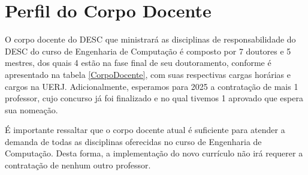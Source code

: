 \section{Perfil do Corpo Docente}
O corpo docente do DESC que ministrará as disciplinas de responsabilidade do DESC do curso de Engenharia de Computação é composto por 7 doutores e 5 mestres, dos quais 4 estão na fase final de seu doutoramento, conforme é apresentado na tabela \ref{CorpoDocente}, com suas respectivas cargas horárias e cargos na UERJ. Adicionalmente, esperamos para 2025 a contratação de mais 1 professor, cujo concurso já foi finalizado e no qual tivemos 1 aprovado que espera sua nomeação.

É importante ressaltar que o corpo docente atual é suficiente para atender a demanda de todas as disciplinas oferecidas no curso de Engenharia de Computação. Desta forma, a implementação do novo currículo não irá requerer a contratação de nenhum outro professor.

